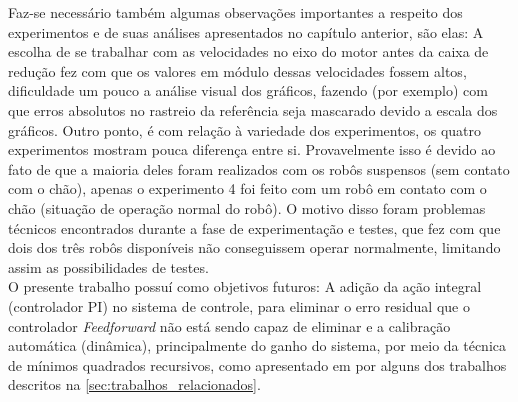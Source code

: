 Faz-se necessário também algumas observações importantes a respeito dos experimentos e de suas análises apresentados no capítulo anterior, são elas: A escolha de se trabalhar com as velocidades no eixo do motor antes da caixa de redução fez com que os valores em módulo dessas velocidades fossem altos, dificuldade um pouco a análise visual dos gráficos, fazendo (por exemplo) com que erros absolutos no rastreio da referência seja mascarado devido a escala dos gráficos. Outro ponto, é com relação à variedade dos experimentos, os quatro experimentos mostram pouca diferença entre si. Provavelmente isso é devido ao fato de que a maioria deles foram realizados com os robôs suspensos (sem contato com o chão), apenas o experimento 4 foi feito com um robô em contato com o chão (situação de operação normal do robô). O motivo disso foram problemas técnicos encontrados durante a fase de experimentação e testes, que fez com que dois dos três robôs disponíveis não conseguissem operar normalmente, limitando assim as possibilidades de testes.\\

O presente trabalho possuí como objetivos futuros: A adição da ação integral (controlador PI) no sistema de controle, para eliminar o erro residual que o controlador \emph{Feedforward} não está sendo capaz de eliminar e a calibração automática (dinâmica), principalmente do ganho do sistema, por meio da técnica de mínimos quadrados recursivos, como apresentado em por alguns dos trabalhos descritos na \autoref{sec:trabalhos_relacionados}.

